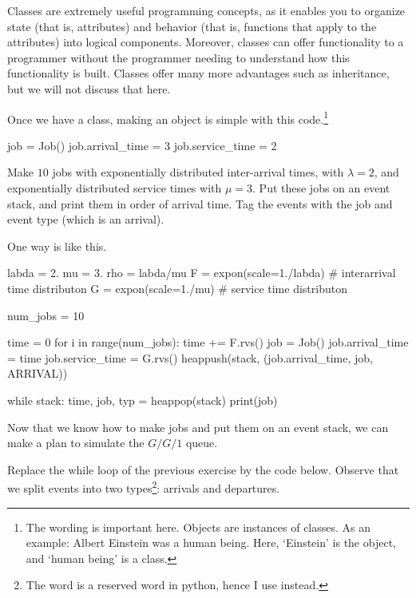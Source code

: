 Classes are extremely useful programming concepts, as it enables you to organize state (that is, attributes) and behavior (that is, functions that apply to the attributes) into logical components. Moreover, classes can offer functionality to a programmer without the programmer needing to understand how this functionality is built. Classes offer many more advantages such as inheritance, but we will not discuss that here. 

Once we have a class, making an object is simple with this code.\footnote{The wording is important here. Objects are instances of classes. As an example: Albert Einstein was a human being. Here, `Einstein' is the object, and `human being' is a class.}

\begin{pyverbatim}
job = Job()
job.arrival_time = 3
job.service_time = 2
\end{pyverbatim}

\begin{exercise}\label{ex:3}
  Make $10$ jobs with exponentially distributed inter-arrival times, with $\lambda=2$,  and exponentially distributed service times with $\mu=3$. Put these jobs on an event stack, and print them in order of arrival time. Tag the events with the job and event type (which is an arrival).
  \begin{solution}
One way is like this.     
    \begin{pyverbatim}
labda = 2.
mu = 3.
rho = labda/mu
F = expon(scale=1./labda)  # interarrival time distributon
G = expon(scale=1./mu)  # service time distributon

num_jobs = 10

time = 0
for i in range(num_jobs):
    time += F.rvs()
    job = Job()
    job.arrival_time = time
    job.service_time = G.rvs()
    heappush(stack, (job.arrival_time, job, ARRIVAL))


while stack:
    time, job, typ = heappop(stack)
    print(job)
    
    \end{pyverbatim}
  \end{solution}
\end{exercise}

Now that we know how to make jobs and put them on an event stack, we can make a plan to simulate the $G/G/1$ queue. 

  Replace the while loop of the previous exercise by the code below. Observe that we split events into two types\footnote{The word  is a reserved word in python, hence I use  instead.}: arrivals and departures. 


